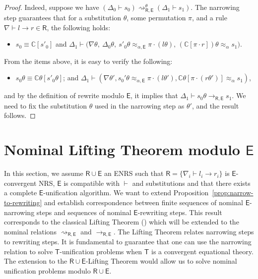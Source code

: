 \documentclass[11pt,a4paper]{amsart}
\newcommand{\daniele}[1]{\textcolor{cyan}{#1}}
\newcommand{\aleq}{\approx_{\alpha}}
\newcommand{\ealeq}{\approx_{\alpha,\theory{E}}}
\newcommand{\theory}[1]{\ensuremath{\mathsf{#1}}}
\newcommand{\context}[1]{\mathbb{C}}
\theoremstyle{plain}
\theoremstyle{definition}
\theoremstyle{remark}
\begin{document}
\begin{proof}
    Indeed, suppose we have $(\Delta_0\vdash s_0) \rightsquigarrow_{\theory{R,E}}^{\theta} (\Delta_1 \vdash s_1) $. The narrowing step guarantees that for a substitution $\theta$, some permutation $\pi$, and a rule $\nabla\vdash l\to r\in \theory{R}$, the following holds:  
    \begin{itemize}
        \item $s_0 \equiv \context{C}[s'_0]$ and $\Delta_1\vdash \big(\nabla\theta,~\Delta_0\theta,~ s'_0\theta \ealeq \pi\cdot (l\theta), \,(\context{C}[\pi\cdot r])\theta \aleq s_1\big)$. 
    \end{itemize}

   From the items above, it is easy to verify  the following:
   \begin{itemize} 
   \item $s_0\theta \equiv \context{C}\theta[s'_0\theta]$; and    $\Delta_1 \vdash (\nabla\theta', s_0'\theta \ealeq \pi\cdot (l\theta'), \context{C}\theta[\pi\cdot(r\theta')] \aleq s_1)$, 
   \end{itemize} 
   and  by the definition of rewrite modulo $\theory{E}$,  it implies that  $\Delta_1 \vdash s_0\theta \rightarrow_{\theory{R,E}} s_1$.
    We need to fix the substitution $\theta$ used in the narrowing step as $\theta'$, and the result follows.
\end{proof}


\section{Nominal Lifting Theorem modulo \theory{E}}\label{section:NomLiftingModuloC}

In this section, we assume $\theory{R}\cup \theory{E}$ an ENRS such that  $\theory{R}=\{\nabla_i\vdash l_i\to r_i\}$ is $\theory{E}$-convergent NRS, \theory{E} is compatible with $\vdash$ and substitutions and that there exists a complete \theory{E}-unification algorithm. We want to extend Proposition~\ref{prop:narrow-to-rewriting}  and establish correspondence between finite sequences of nominal $\theory{E}$-narrowing steps and sequences of nominal $\theory{E}$-rewriting steps. This result corresponds to the classical Lifting Theorem (\cite{Hullot80,JouannaudKK83:Incremental,NominalNarrowing16}) which will be extended to the nominal relations $\rightsquigarrow_{\theory{R,E}}$ and $\to_{\theory{R,E}}$. The Lifting Theorem relates narrowing steps to rewriting steps. It is fundamental to guarantee that one can use the narrowing relation to solve \theory{T}-unification problems when \theory{T} is a convergent equational theory. The extension to the \theory{R\cup E}-Lifting Theorem would allow us to solve nominal unification problems modulo $\theory{R}\cup \theory{E}$.
\end{document}
